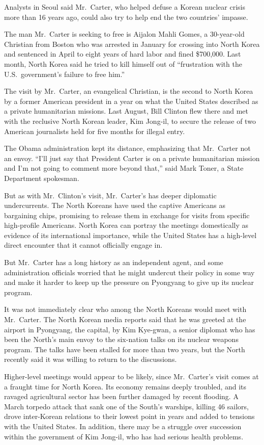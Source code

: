 ﻿\documentclass[12pt]{article}
\begin{document}
Analysts in Seoul said Mr.~Carter, who helped defuse a Korean nuclear crisis more than 16 years ago,
could also try to help end the two countries' impasse.

The man Mr.~Carter is seeking to free is Aijalon Mahli Gomes, a 30-year-old Christian from Boston
who was arrested in January for crossing into North Korea and sentenced in April to eight years of
hard labor and fined \$700,000. Last month, North Korea said he tried to kill himself out of
``frustration with the U.S.~government's failure to free him.''

The visit by Mr.~Carter, an evangelical Christian, is the second to North Korea by a former American
president in a year on what the United States described as a private humanitarian missions. Last
August, Bill Clinton flew there and met with the reclusive North Korean leader, Kim Jong-il, to
secure the release of two American journalists held for five months for illegal entry.

The Obama administration kept its distance, emphasizing that Mr.~Carter not an envoy. ``I'll just
say that President Carter is on a private humanitarian mission and I'm not going to comment more
beyond that,'' said Mark Toner, a State Department spokesman.

But as with Mr.~Clinton's visit, Mr.~Carter's has deeper diplomatic undercurrents. The North Koreans
have used the captive Americans as bargaining chips, promising to release them in exchange for
visits from specific high-profile Americans. North Korea can portray the meetings domestically as
evidence of its international importance, while the United States has a high-level direct encounter
that it cannot officially engage in.

But Mr.~Carter has a long history as an independent agent, and some administration officials worried
that he might undercut their policy in some way and make it harder to keep up the pressure on
Pyongyang to give up its nuclear program.

It was not immediately clear who among the North Koreans would meet with Mr.~Carter. The North
Korean media reports said that he was greeted at the airport in Pyongyang, the capital, by Kim
Kye-gwan, a senior diplomat who has been the North's main envoy to the six-nation talks on its
nuclear weapons program. The talks have been stalled for more than two years, but the North recently
said it was willing to return to the discussions.

Higher-level meetings would appear to be likely, since Mr.~Carter's visit comes at a fraught time
for North Korea. Its economy remains deeply troubled, and its ravaged agricultural sector has been
further damaged by recent flooding. A March torpedo attack that sank one of the South's warships,
killing 46 sailors, drove inter-Korean relations to their lowest point in years and added to
tensions with the United States. In addition, there may be a struggle over succession within the
government of Kim Jong-il, who has had serious health problems.
\end{document}
